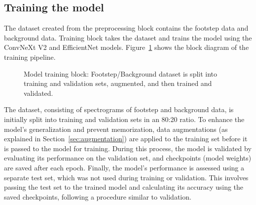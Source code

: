 \subsection{Training the model}
The dataset created from the preprocessing block contains the footstep data and background data. Training block takes the dataset and trains the model using the ConvNeXt V2 and EfficientNet models. Figure~\ref{fig:training_block} shows the block diagram of the training pipeline.
\begin{figure}[ht]
  \centering
  \caption{Model training block: Footstep/Background dataset is split into training and validation sets, augmented, and then trained and validated.}
  \label{fig:training_block}
\end{figure}

The dataset, consisting of spectrograms of footstep and background data, is initially split into training and validation sets in an 80:20 ratio. To enhance the model's generalization and prevent memorization, data augmentations (as explained in Section~\ref{sec:augmentation}) are applied to the training set before it is passed to the model for training. During this process, the model is validated by evaluating its performance on the validation set, and checkpoints (model weights) are saved after each epoch. Finally, the model's performance is assessed using a separate test set, which was not used during training or validation. This involves passing the test set to the trained model and calculating its accuracy using the saved checkpoints, following a procedure similar to validation. 
